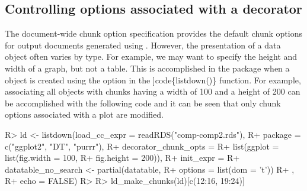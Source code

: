 \documentclass[
]{jss}
\begin{document}
\hypertarget{controlling-options-associated-with-a-decorator}{%
\subsection{Controlling options associated with a
decorator}\label{controlling-options-associated-with-a-decorator}}

The document-wide chunk option specification provides the default chunk
options for output documents generated using . However,
the presentation of a data object often varies by type. For example, we
may want to specify the height and width of a graph, but not a table.
This is accomplished in the  package when a
 object is created using the 
option in the {]}code\{listdown()\} function. For example, associating
all  objects with  chunks having a width of 100
and a height of 200 can be accomplished with the following code and it
can be seen that only chunk options associated with a plot are modified.

\begin{CodeChunk}

\begin{CodeInput}
R> ld <- listdown(load_cc_expr = readRDS("comp-comp2.rds"),
R+                package = c("ggplot2", "DT", "purrr"),
R+                decorator_chunk_opts = 
R+                  list(ggplot = list(fig.width = 100,
R+                                     fig.height = 200)),
R+                init_expr = {
R+                  datatable_no_search <- partial(datatable,
R+                                                 options = list(dom = 't'))
R+                  },
R+                echo = FALSE)
R> 
R> ld_make_chunks(ld)[c(12:16, 19:24)]
\end{CodeInput}

\end{CodeChunk}
\end{document}

